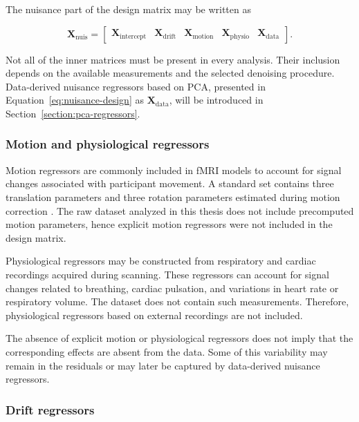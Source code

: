 \documentclass[english]{pwr_wmat_praca_dyplomowa}
\theoremstyle{definition}
\theoremstyle{remark}
\begin{document}
The nuisance part of the design matrix may be written as

\begin{equation}
    \mathbf{X}_{\mathrm{nuis}} =
    \begin{bmatrix}
        \mathbf{X}_{\mathrm{intercept}} & \mathbf{X}_{\mathrm{drift}} & \mathbf{X}_{\mathrm{motion}} & \mathbf{X}_{\mathrm{physio}} & \mathbf{X}_{\mathrm{data}}
    \end{bmatrix}.
    \label{eq:nuisance-design}
\end{equation}

Not all of the inner matrices must be present in every analysis. Their inclusion depends on the available measurements and the selected denoising procedure. Data-derived nuisance regressors based on PCA, presented in Equation~\eqref{eq:nuisance-design} as $\mathbf{X}_{\mathrm{data}}$, will be introduced in Section~\ref{section:pca-regressors}.

\subsubsection{Motion and physiological regressors}

Motion regressors are commonly included in fMRI models to account for signal changes associated with participant movement. A standard set contains three translation parameters and three rotation parameters estimated during motion correction \cite{motion-correction}. The raw dataset analyzed in this thesis does not include precomputed motion parameters, hence explicit motion regressors were not included in the design matrix.

Physiological regressors may be constructed from respiratory and cardiac recordings acquired during scanning. These regressors can account for signal changes related to breathing, cardiac pulsation, and variations in heart rate or respiratory volume. The dataset does not contain such measurements. Therefore, physiological regressors based on external recordings are not included.

The absence of explicit motion or physiological regressors does not imply that the corresponding effects are absent from the data. Some of this variability may remain in the residuals or may later be captured by data-derived nuisance regressors.

\subsubsection{Drift regressors}
\end{document}
